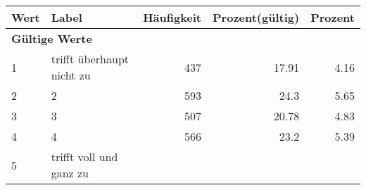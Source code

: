     \begin{longtable}{lXrrr}
     \toprule
     \textbf{Wert} & \textbf{Label} & \textbf{Häufigkeit} & \textbf{Prozent(gültig)} & \textbf{Prozent} \\
     \endhead
     \midrule
     \multicolumn{5}{l}{\textbf{Gültige Werte}}\\

     1 &
     \multicolumn{1}{X}{ trifft überhaupt nicht zu   } &


       \num{437} &
       \num[round-mode=places,round-precision=2]{17.91} &
         \num[round-mode=places,round-precision=2]{4.16} \\

     2 &
     \multicolumn{1}{X}{ 2   } &


       \num{593} &
       \num[round-mode=places,round-precision=2]{24.3} &
         \num[round-mode=places,round-precision=2]{5.65} \\

     3 &
     \multicolumn{1}{X}{ 3   } &


       \num{507} &
       \num[round-mode=places,round-precision=2]{20.78} &
         \num[round-mode=places,round-precision=2]{4.83} \\

     4 &
     \multicolumn{1}{X}{ 4   } &


       \num{566} &
       \num[round-mode=places,round-precision=2]{23.2} &
         \num[round-mode=places,round-precision=2]{5.39} \\

     5 &
     \multicolumn{1}{X}{ trifft voll und ganz zu   } &



\end{longtable}
